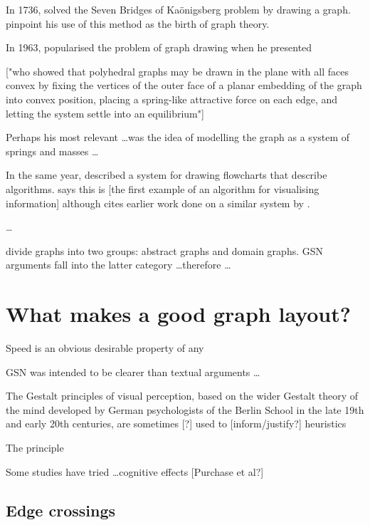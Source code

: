 \documentclass[authoryearcitations]{UoYCSproject}
\begin{document}
In 1736, \citet{euler} solved the Seven Bridges of Ka\"{o}nigsberg problem by drawing a graph.
\citet{ismail2009some}
pinpoint his use of this method as the birth of graph theory.

In 1963, \citet{tutte} popularised the problem of graph drawing when he presented 


["who showed that polyhedral graphs may be drawn in the plane with all faces convex by fixing the vertices of the outer face of a planar embedding of the graph into convex position, placing a spring-like attractive force on each edge, and letting the system settle into an equilibrium"]

Perhaps his most relevant \ldots was the idea of modelling the graph as a system of springs and masses \ldots 

In the same year, \citet{Knuth63} described a system for drawing flowcharts that describe algorithms. \citet{battista}  says this is [the first example of an algorithm for visualising information] although \citeauthor{Knuth63} cites earlier work done on a similar system by \citet{haibt1959}.




\ldots

\citet{huang2007effects} divide graphs into two groups: abstract graphs and domain graphs.
GSN arguments fall into the latter category \ldots  therefore \ldots
{}


\section{What makes a good graph layout?}

Speed is an obvious desirable property of any 

GSN was intended to be clearer than textual arguments \ldots

The Gestalt principles of visual perception, based on the wider Gestalt theory of the mind developed by German psychologists of the Berlin School in the late 19th and early 20th centuries, are sometimes [?] used to [inform/justify?] heuristics

The principle 

Some studies have tried \ldots cognitive effects [Purchase et al?]

\subsection{Edge crossings}
\end{document}
